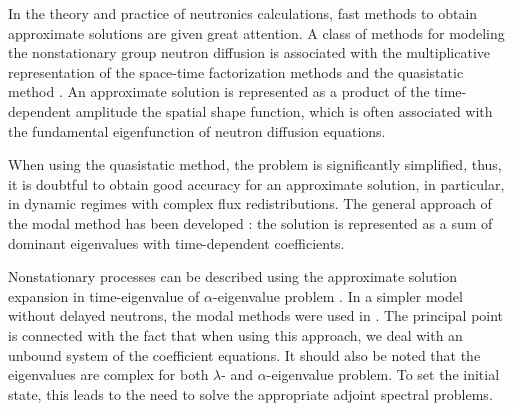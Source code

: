 \documentclass[a4paper]{jpconf}
\begin{document}
In the theory and practice of neutronics calculations, fast methods to obtain approximate solutions are given great attention. A class of methods for modeling the nonstationary group neutron diffusion is associated with the multiplicative representation of the space-time factorization methods and the quasistatic method \cite{dodds1976accuracy}.
An approximate solution is represented as a product of the time-dependent amplitude the spatial shape function, which is often associated with the fundamental eigenfunction of neutron diffusion equations. 

When using the quasistatic method, the problem is significantly simplified, thus, it is doubtful to obtain good accuracy for an approximate solution, in particular, in dynamic regimes with complex flux redistributions. The general approach of the modal method has been  developed  \cite{stacey1967modal}:
the solution is represented as a sum of dominant eigenvalues with time-dependent coefficients.

Nonstationary processes can be described using the approximate solution expansion in time-eigenvalue of  $\alpha$-eigenvalue problem \cite{verdu20103d}.
In a simpler model without delayed neutrons, the modal methods were used in  \cite{modak2007scheme}.
The principal point is connected with the fact that when using this approach, we deal with an unbound system of the coefficient equations. It should also be noted that the eigenvalues are complex for both   $\lambda$- and 
$\alpha$-eigenvalue problem. To set the initial state, this leads to the need to solve the appropriate adjoint spectral problems.

\end{document}
